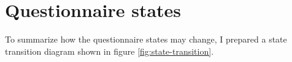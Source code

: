\section{Questionnaire states}\label{questionnaire-states}

To summarize how the questionnaire states may change, I prepared a state transition diagram shown in figure \ref{fig:state-transition}.

